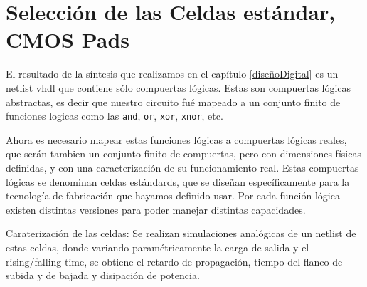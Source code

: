 





\section{Selección de las Celdas estándar, CMOS Pads}\label{celdasEstandars}
El resultado de la síntesis que realizamos en el capítulo \ref{diseñoDigital} es un netlist vhdl que contiene sólo compuertas lógicas. Estas son compuertas lógicas abstractas, es decir que nuestro circuito fué mapeado a un conjunto finito de funciones logicas como las \verb.and., \verb.or., \verb.xor., \verb.xnor., etc.

Ahora es necesario mapear estas funciones lógicas a compuertas lógicas reales, que serán tambien un conjunto finito de compuertas, pero con dimensiones físicas definidas, y con una caracterización de su funcionamiento real. Estas compuertas lógicas se denominan celdas estándards, que se diseñan específicamente para la tecnología de fabricación que hayamos definido usar. Por cada función lógica existen distintas versiones para poder manejar distintas capacidades. 

Caraterización de las celdas: Se realizan simulaciones analógicas de un netlist de estas celdas, donde variando paramétricamente la carga de salida y el rising/falling time, se obtiene el retardo de propagación, tiempo del flanco de subida y de bajada y disipación de potencia.


